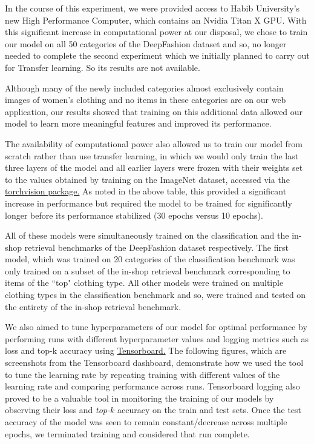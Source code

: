 In the course of this experiment, we were provided access to Habib University’s new High Performance Computer, which contains an Nvidia Titan X GPU. With this significant increase in computational power at our disposal, we chose to train our model on all 50 categories of the DeepFashion dataset and so, no longer needed to complete the second experiment which we initially planned to carry out for Transfer learning. So its results are not available.

Although many of the newly included categories almost exclusively contain images of women’s clothing and no items in these categories are on our web application, our results showed that training on this additional data allowed our model to learn more meaningful features and improved its performance.

The availability of computational power also allowed us to train our model from scratch rather than use transfer learning, in which we would only train the last three layers of the model and all earlier layers were frozen with their weights set to the values obtained by training on the ImageNet dataset, accessed via the  \href{https://pytorch.org/docs/stable/torchvision}{torchvision package.} As noted in the above table, this provided a significant increase in performance but required the model to be trained for significantly longer before its performance stabilized (30 epochs versus 10 epochs).

All of these models were simultaneously trained on the classification and the in-shop retrieval benchmarks of the DeepFashion dataset respectively. The first model, which was trained on 20 categories of the classification benchmark was only trained on a subset of the in-shop retrieval benchmark corresponding to items of the ``top" clothing type. All other models were trained on multiple clothing types in the classification benchmark and so, were trained and tested on the entirety of the in-shop retrieval benchmark.

We also aimed to tune hyperparameters of our model for optimal performance by performing runs with different hyperparameter values and logging metrics such as loss and top-k accuracy using \href{https://www.tensorflow.org/tensorboard}{Tensorboard.} The following figures, which are screenshots from the Tensorboard dashboard, demonstrate how we used the tool to tune the learning rate by repeating training with different values of the learning rate and comparing performance across runs. Tensorboard logging also proved to be a valuable tool in monitoring the training of our models by observing their loss and \textit{top-$k$} accuracy on the train and test sets. Once the test accuracy of the model was seen to remain constant/decrease across multiple epochs, we terminated training and considered that run complete. 

